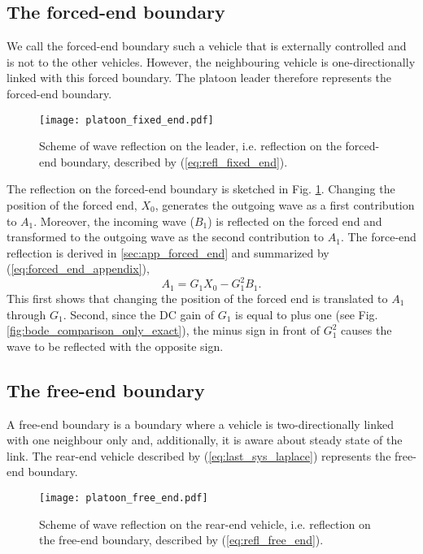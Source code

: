 \documentclass[final,5p,times,twocolumn]{elsarticle}
\begin{document}
\subsection{The forced-end boundary}
\label{sec:forced_end_boundary}
We call the forced-end boundary such a vehicle that is externally controlled and is not to the other vehicles. However, the neighbouring vehicle is one-directionally linked with this forced boundary. The platoon leader therefore represents the forced-end boundary.
\begin{figure}[htb]\centering
 \texttt{[image: platoon\_fixed\_end.pdf]}
  \caption{Scheme of wave reflection on the leader, i.e. reflection on the forced-end boundary, described by (\ref{eq:refl_fixed_end}).}
  \label{fig:fixed_end}
\end{figure}
The reflection on the forced-end boundary is sketched in Fig. \ref{fig:fixed_end}. Changing the position of the forced end, $X_0$, generates the outgoing wave as a first contribution to $A_1$. Moreover, the incoming wave ($B_1$) is reflected on the forced end and transformed to the outgoing wave as the second contribution to $A_1$. The force-end reflection is derived in \ref{sec:app_forced_end} and summarized by (\ref{eq:forced_end_appendix}),
\begin{equation}
  A_1 = G_1 X_{0}-G_1^2B_1.
  \label{eq:refl_fixed_end}
\end{equation}
This first shows that changing the position of the forced end is translated to $A_{1}$ through $G_{1}$. Second, since the DC gain of $G_1$ is equal to plus one (see Fig. \ref{fig:bode_comparison_only_exact}), the minus sign in front of $G_1^2$ causes the wave to be reflected with the opposite sign.

\subsection{The free-end boundary}
\label{sec:free_end_boundary}
A free-end boundary is a boundary where a vehicle is two-directionally linked with one neighbour only and, additionally, it is aware about steady state of the link. The rear-end vehicle described by (\ref{eq:last_sys_laplace}) represents the free-end boundary.

\begin{figure}[ht]
 \centering
  \texttt{[image: platoon\_free\_end.pdf]}
  \caption{Scheme of wave reflection on the rear-end vehicle, i.e. reflection on the free-end boundary, described by (\ref{eq:refl_free_end}).}
  \label{fig:free_end}
\end{figure}
\end{document}
